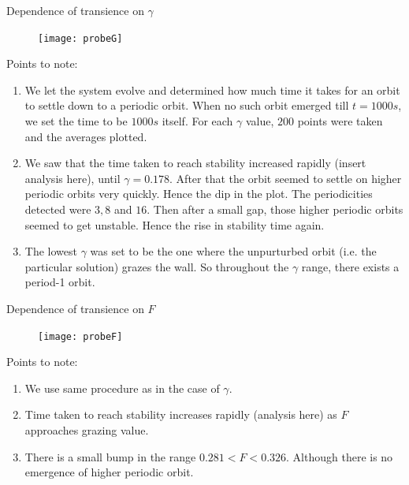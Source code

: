 \documentclass[xcolor=x11names,compress]{beamer}
\renewcommand{\(}{\begin{columns}}
\renewcommand{\)}{\end{columns}}
\newcommand{\<}[1]{\begin{column}{#1}}
\renewcommand{\>}{\end{column}}
\begin{document}
\begin{frame}{Dependence of transience on $\gamma$}
\begin{figure}
\begin{center}
\texttt{[image: probeG]}
\end{center}
\end{figure}
\end{frame}

\begin{frame}{Points to note:}
\begin{enumerate}
\item We let the system evolve and determined how much time it takes for an 
orbit to settle down to a periodic orbit.  When no such orbit emerged till $t=1000s$, we set 
the time to be $1000s$ itself.  For each $\gamma$ value, $200$ 
points were taken and the averages plotted.  
\item We saw that the time taken to reach stability increased rapidly (insert 
analysis here), until $\gamma=0.178$.  After that the orbit seemed to settle 
on higher periodic orbits very quickly.  Hence the dip in the plot.  The 
periodicities detected were $3,8$ and $16$.  Then after a small gap, those 
higher periodic orbits seemed to get unstable.  Hence the rise in stability 
time again.  
\item The lowest $\gamma$ was set to be the one where the unpurturbed orbit 
(i.e. the particular solution) grazes the wall.  So throughout the $\gamma$ 
range, there exists a period-1 orbit.  
\end{enumerate}


\end{frame}


\begin{frame}{Dependence of transience on $F$}
\begin{figure}
\caption{}
\begin{center}
\texttt{[image: probeF]}
\end{center}
\end{figure}
\end{frame}

\begin{frame}{Points to note:}
\begin{enumerate}
\item We use same procedure as in the case of $\gamma$.  
\item Time taken to reach stability increases rapidly (analysis here) as $F$ 
approaches grazing value.  
\item There is a small bump in the range  $0.281<F<0.326$.  Although there is 
no emergence of higher periodic orbit.  
\end{enumerate}
\end{frame}
\end{document}

